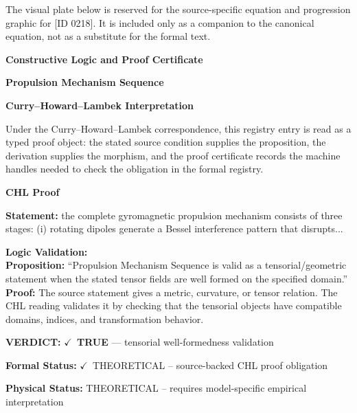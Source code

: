 \begingroup\footnotesize\sloppy
The visual plate below is reserved for the source-specific equation and progression graphic for [ID 0218]. It is included only as a companion to the canonical equation, not as a substitute for the formal text.
\par\endgroup
\ifTZPDarkEdition
{}
\fi

\clearpage
\begingroup\tzpsupportsetup
\noindent\textbf{\fontsize{10.8pt}{12.8pt}\selectfont [ID 0218] Constructive Logic and Proof Certificate}\par
\noindent\textbf{\fontsize{10pt}{12pt}\selectfont Propulsion Mechanism Sequence}\par
\vspace{0.45em}
\begingroup
\footnotesize
\setlength{\parskip}{0.22em}
\setlength{\parindent}{0pt}
\noindent\textbf{Curry--Howard--Lambek Interpretation}\par
Under the Curry--Howard--Lambek correspondence, this registry entry is read as a typed proof
object: the stated source condition supplies the proposition, the derivation supplies the
morphism, and the proof certificate records the machine handles needed to check the obligation
in the formal registry.

\vspace{0.45em}
\noindent\textbf{CHL Proof}\par
\textbf{Statement:} the complete gyromagnetic propulsion mechanism consists of three stages: (i) rotating
dipoles generate a Bessel interference pattern that disrupts...

\textbf{Logic Validation:}\\
\textbf{Proposition:} ``Propulsion Mechanism Sequence is valid as a tensorial/geometric statement when the
stated tensor fields are well formed on the specified domain.''\\
\textbf{Proof:} The source statement gives a metric, curvature, or tensor relation. The CHL reading
validates it by checking that the tensorial objects have compatible domains, indices,
and transformation behavior.

\textbf{VERDICT:} \ensuremath{\checkmark}\ \textbf{TRUE} --- tensorial well-formedness validation

\textbf{Formal Status:} \ensuremath{\checkmark}\ THEORETICAL -- source-backed CHL proof obligation

\textbf{Physical Status:} THEORETICAL -- requires model-specific empirical interpretation
\par\vspace{0.45em}
\par
\ifTZPDarkEdition
{}
\fi
\endgroup
\endgroup
